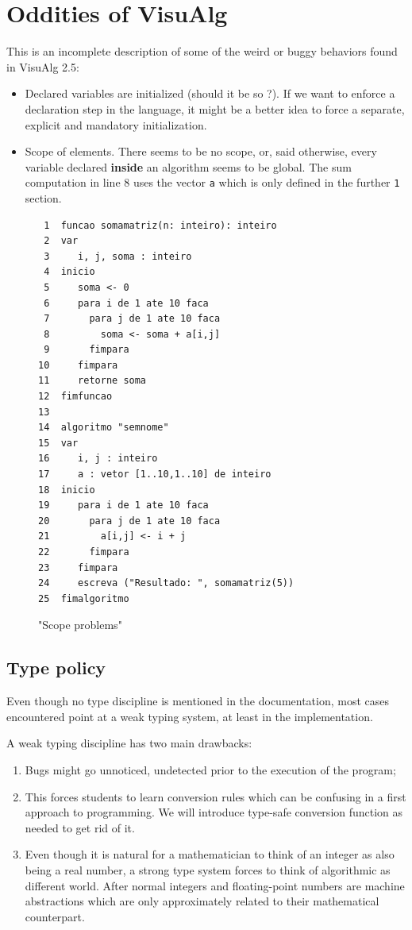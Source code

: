 \documentclass[11pt]{article}
\begin{document}
\section{Oddities of VisuAlg}
\label{sec-3}

This is an incomplete description of some of the weird or buggy behaviors
found in VisuAlg 2.5:

\begin{itemize}
\item Declared variables are initialized (should it be so ?). If we want to
enforce a declaration step in the language, it might be a better idea to
force a separate, explicit and mandatory initialization.

\item Scope of elements.
There seems to be no scope, or, said otherwise, every
variable declared \textbf{inside} an algorithm seems to be global.
The sum computation in line 8 uses the vector \texttt{a} which is only
defined in the further \texttt{1} section.
\end{itemize}


\begin{figure}[H]
\begin{verbatim}
 1  funcao somamatriz(n: inteiro): inteiro
 2  var
 3     i, j, soma : inteiro
 4  inicio
 5     soma <- 0
 6     para i de 1 ate 10 faca
 7       para j de 1 ate 10 faca
 8         soma <- soma + a[i,j]
 9       fimpara
10     fimpara
11     retorne soma
12  fimfuncao
13
14  algoritmo "semnome"
15  var
16     i, j : inteiro
17     a : vetor [1..10,1..10] de inteiro
18  inicio
19     para i de 1 ate 10 faca
20       para j de 1 ate 10 faca
21         a[i,j] <- i + j
22       fimpara
23     fimpara
24     escreva ("Resultado: ", somamatriz(5))
25  fimalgoritmo
\end{verbatim}\caption{"Scope problems"}

\end{figure}


\subsection{Type policy}
\label{sec-3-1}

Even though no type discipline is mentioned in the documentation, most cases
encountered point at a weak typing system, at least in the implementation.

A weak typing discipline has two main drawbacks:
\begin{enumerate}
\item Bugs might go unnoticed, undetected prior to the execution of the program;
\item This forces students to learn conversion rules which can be confusing in a
first approach to programming. We will introduce type-safe
conversion function as needed to get rid of it.
\item Even though it is natural for a mathematician to think of an integer as
also being a real number, a strong type system forces to think of
algorithmic as
different world. After normal integers and floating-point numbers are
machine abstractions which are only approximately related to their
mathematical counterpart.
\end{enumerate}
\end{document}
